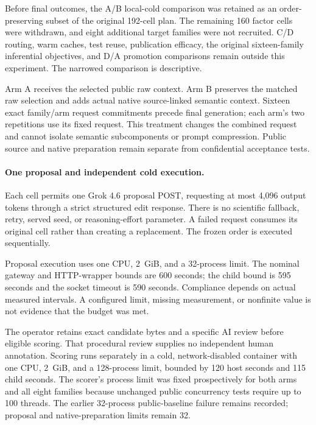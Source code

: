 \documentclass{article}
\begin{document}
Before final outcomes, the A/B local-cold comparison was retained as an
order-preserving subset of the original 192-cell plan. The remaining 160 factor
cells were withdrawn, and eight additional target families were not recruited.
C/D routing, warm caches, test reuse, publication efficacy, the original
sixteen-family inferential objectives, and D/A promotion comparisons remain
outside this experiment. The narrowed comparison is descriptive.

Arm A receives the selected public raw context. Arm B preserves the matched
raw selection and adds actual native source-linked semantic context.
Sixteen exact family/arm request commitments precede final generation; each
arm's two repetitions use its fixed request. This treatment changes the
combined request and cannot isolate semantic subcomponents or prompt
compression. Public source and native preparation remain separate from
confidential acceptance tests.

\paragraph{One proposal and independent cold execution.}
Each cell permits one Grok 4.6 proposal POST, requesting at most 4,096 output
tokens through a strict structured edit response. There is no scientific
fallback, retry, served seed, or reasoning-effort parameter. A failed request
consumes its original cell rather than creating a replacement. The frozen
order is executed sequentially.

Proposal execution uses one CPU, 2~GiB, and a 32-process limit. The nominal
gateway and HTTP-wrapper bounds are 600 seconds; the child bound is 595 seconds
and the socket timeout is 590 seconds. Compliance depends on actual measured
intervals. A configured limit, missing measurement, or nonfinite value is not
evidence that the budget was met.

The operator retains exact candidate bytes and a specific AI review before
eligible scoring. That procedural review supplies no independent human
annotation. Scoring runs separately in a cold, network-disabled container with
one CPU, 2~GiB, and a 128-process limit, bounded by 120 host seconds and 115
child seconds. The scorer's process limit was fixed prospectively for both
arms and all eight families because unchanged public concurrency tests require
up to 100 threads. The earlier 32-process public-baseline failure remains
recorded; proposal and native-preparation limits remain 32.
\end{document}
